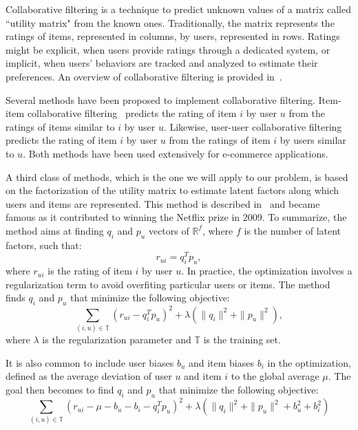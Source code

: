 \documentclass[10pt, conference, compsocconf]{IEEEtran}
\begin{document}
Collaborative filtering is a technique to predict unknown values of a 
matrix called ``utility matrix" from the known ones. Traditionally, the 
matrix represents the ratings of items, represented in columns, by 
users, represented in rows. Ratings might be explicit, when users 
provide ratings through a dedicated system, or implicit, when users' 
behaviors are tracked and analyzed to estimate their preferences. An 
overview of collaborative filtering is provided 
in~\cite{leskovec2014mining}.

Several methods have been proposed to implement collaborative 
filtering. Item-item collaborative filtering~\cite{breese1998empirical, linden2003amazon} predicts 
the rating of item $i$ by user $u$ from the ratings of items similar to 
$i$ by user $u$. Likewise, user-user collaborative 
filtering~\cite{breese1998empirical} predicts the rating of item $i$ by user $u$ 
from the ratings of item $i$ by users similar to $u$. Both methods
have been used extensively for e-commerce applications.

A third class of methods, which is the one we will apply to our 
problem, is based on the factorization of the utility matrix to 
estimate latent factors along which users and items are represented. 
This method is described 
in~\cite{koren2009matrix} and became famous as it contributed to winning the 
Netflix prize in 2009. To summarize, the method aims at finding $q_i$ 
and $p_u$ vectors of $\mathbb{R}^f$, where $f$ is the number of latent factors, such that:
\begin{equation*}
r_{ui} = q_i^Tp_u,
\end{equation*}
where $r_{ui}$ is the rating of item $i$ by user $u$. In practice, the optimization
involves a regularization term to avoid overfiting particular users or items. The method
finds $q_i$ and $p_u$ that minimize the following objective:
\begin{equation*}
\sum_{(i,u) \in \mathbb{T}}\left( r_{ui} - q_i^Tp_u\right)^2+\lambda \left( \|{q_i}\|^2 + \|{p_u}\|^2\right)
,
\end{equation*}
where $\lambda$ is the regularization parameter and $\mathbb{T}$ is the training set.

It is also common to include user biases $b_u$ and item biases $b_i$ in 
the optimization, defined as the average deviation of user $u$ and item 
$i$ to the global average $\mu$. The goal then becomes to find $q_i$ and $p_u$ that minimize the 
following objective:
\begin{equation*}
\sum_{(i,u) \in \mathbb{T}}\left( r_{ui} - \mu - b_u - b_i - q_i^Tp_u\right)^2+\lambda \left( \|{q_i}\|^2 + \|{p_u}\|^2 + b_u^2 + b_i^2\right)
\end{equation*}
\end{document}
